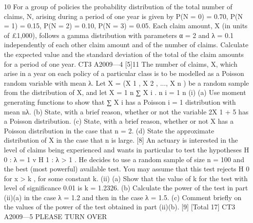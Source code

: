\documentclass[a4paper,12pt]{article}
\begin{document}
\begin{enumerate}
10
For a group of policies the probability distribution of the total number of claims, N,
arising during a period of one year is given by
P(N = 0) = 0.70, P(N = 1) = 0.15, P(N = 2) = 0.10, P(N = 3) = 0.05.
Each claim amount, X (in units of £1,000), follows a gamma distribution with
parameters α = 2 and λ = 0.1 independently of each other claim amount and of the
number of claims.
Calculate the expected value and the standard deviation of the total of the claim
amounts for a period of one year.
CT3 A2009—4
[5]11
The number of claims, X, which arise in a year on each policy of a particular class is
to be modelled as a Poisson random variable with mean λ. Let X = (X 1 , X 2 , ..., X n ) be
a random sample from the distribution of X, and let X =
1 n
∑ X i .
n i = 1
n
(i)
(a)
Use moment generating functions to show that
∑ X i has a Poisson
i = 1
distribution with mean nλ.
(b) State, with a brief reason, whether or not the variable 2X 1 + 5 has a
Poisson distribution.
(c) State, with a brief reason, whether or not X has a Poisson distribution
in the case that n = 2.
(d) State the approximate distribution of X in the case that n is large.
[8]
An actuary is interested in the level of claims being experienced and wants in
particular to test the hypotheses
H 0 : λ = 1 v H 1 : λ > 1 .
He decides to use a random sample of size n = 100 and the best (most powerful)
available test. You may assume that this test rejects H 0 for x > k , for some
constant k.
(ii)
(a) Show that the value of k for the test with level of significance 0.01 is
k = 1.2326.
(b) Calculate the power of the test in part (ii)(a) in the case λ = 1.2 and
then in the case λ = 1.5.
(c) Comment briefly on the values of the power of the test obtained in part
(ii)(b).
[9]
[Total 17]
CT3 A2009—5
PLEASE TURN OVER




\end{enumerate}
\end{document}
